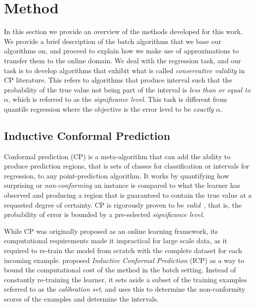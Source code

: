 \section{Method}
\label{sec:uncertain-trees-method}

In this section we provide an overview of the methods developed for this work.
We provide a brief description of the batch algorithms that we base our algorithms
on, and proceed to explain how we make use of approximations to transfer them to
the online domain. We deal with the regression task, and our task is to develop algorithms
that exhibit what is called \emph{conservative validity} in CP literature. This refers
to algorithms that produce interval such that the probability of the true value not
being part of the interval is \emph{less than or equal to} $\alpha$, which is referred
to as the \emph{significance level}. This task is different from quantile regression \cite{koenker2005qr}
where the objective is the error level to be \emph{exactly} $\alpha$.

\subsection{Inductive Conformal Prediction}

Conformal prediction (CP) is a meta-algorithm that can add the ability to
produce prediction regions, that is sets of classes for classification or
intervals for regression, to any point-prediction algorithm. It works by
quantifying how surprising or \emph{non-conforming} an instance is compared
to what the learner has observed and producing a region that is guaranteed
to contain the true value at a requested degree of certainty. CP is rigorously
proven to be \textit{valid}~\cite{vovk2005algorithmic}, that is, the probability of error is bounded
by a pre-selected \emph{significance level}.

While CP was originally proposed as an online learning framework, its computational
requirements made it impractical for large scale data, as it required to re-train
the model from scratch with the complete dataset for each incoming example.
\citet{papadopoulos2002icp} proposed \emph{Inductive Conformal Prediction} (ICP) as
a way to bound the computational cost of the method in the batch setting.
Instead of constantly re-training the learner, it sets aside a subset
of the training examples referred to as the \emph{calibration set},
and uses this to determine the non-conformity scores of the examples
and determine the intervals.

